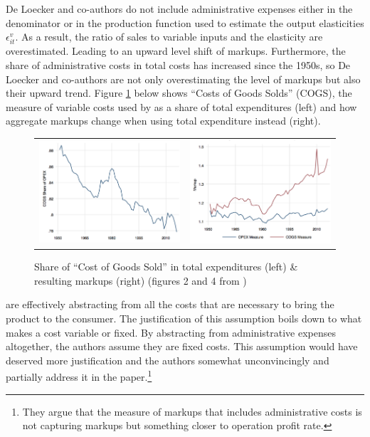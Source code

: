 \documentclass{amsart}
\theoremstyle{definition}
\theoremstyle{remark}
\numberwithin{equation}{section}
\begin{document}
De Loecker and co-authors do not include administrative expenses either in the denominator or in the production function used to estimate the output elasticities $\epsilon_{i t}^v$. As a result, the ratio of sales to variable inputs and the elasticity are overestimated. Leading to an upward level shift of markups. Furthermore, the share of administrative costs in total costs has increased since the 1950s, so De Loecker and co-authors are not only overestimating the level of markups but also their upward trend. Figure \ref{fig:traina} below shows ``Costs of Goods Solds'' (COGS), the measure of variable costs used by \cite{de2019rise} as a share of total expenditures (left) and how aggregate markups change when using total expenditure instead (right).\\ 

\begin{figure}[h!]
    \begin{tabular}{cc}
        \includegraphics[width=0.48 \textwidth]{shareCOGS.PNG} & \includegraphics[width=0.48 \textwidth]{markups.PNG} \\ 
    \end{tabular}
\caption{Share of ``Cost of Goods Sold'' in total expenditures (left)  \& resulting markups (right) (figures 2 and 4 from  \cite{traina2018aggregate})}
\label{fig:traina}
\end{figure}

\cite{de2019rise} are effectively abstracting from all the costs that are necessary to bring the product to the consumer. The justification of this  assumption boils down to what makes a cost variable or fixed. By abstracting from administrative expenses altogether, the authors assume they are fixed costs. This assumption would have deserved more justification and the authors somewhat unconvincingly and partially address it in the paper.\footnote{They argue that the measure of markups that includes administrative costs is not capturing markups but something closer to operation profit rate.}
\end{document}

